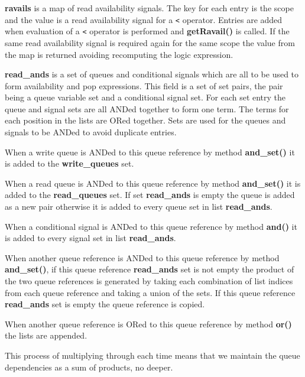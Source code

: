 \documentclass[10pt,a4paper,twoside,fleqn]{book}
\begin{document}
            {\bf ravails} is a map of read availability signals. The key for
            each entry is the scope and the value is a read availability signal
            for a \verb'<' operator. Entries are added when evaluation of a
            \verb'<' operator is performed and {\bf getRavail()} is called. If
            the same read availability signal is required again for the same
            scope the value from the map is returned avoiding recomputing the
            logic expression.

            {\bf read\_ands} is a set of queues and conditional signals which are
            all to be used to form availability and pop expressions. This
            field is a set of set pairs, the pair being a queue variable set and a
            conditional signal set. For each set entry the queue and signal sets are
            all ANDed together to form one term. The terms for each position in the
            lists are ORed together. Sets are used for the queues and signals to be
            ANDed to avoid duplicate entries.

            When a write queue is ANDed to this queue reference by method {\bf
            and\_set()} it is added to the {\bf write\_queues} set.

            When a read queue is ANDed to this queue reference by method {\bf
            and\_set()} it is added to the {\bf read\_queues} set. If set {\bf
            read\_ands} is empty the queue is added as a new pair otherwise it is
            added to every queue set in list {\bf read\_ands}.

            When a conditional signal is ANDed to this queue reference by method
            {\bf and()} it is added to every signal set in list {\bf
            read\_ands}.

            When another queue reference is ANDed to this queue reference by
            method {\bf and\_set()}, if this queue reference {\bf read\_ands} set
            is not empty the product of the two queue references is generated by
            taking each combination of list indices from each queue reference and
            taking a union of the sets. If this queue reference {\bf read\_ands}
            set is empty the queue reference is copied.

            When another queue reference is ORed to this queue reference by method
            {\bf or()} the lists are appended.

            This process of multiplying through each time means that we maintain
            the queue dependencies as a sum of products, no deeper.
\end{document}
